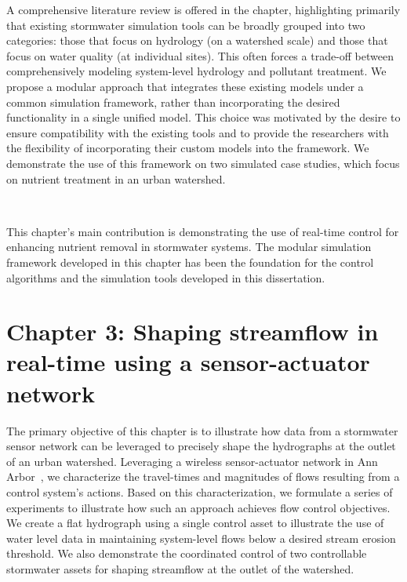 A comprehensive literature review is offered in the chapter, highlighting primarily that existing stormwater simulation tools can be broadly grouped into two categories: those that focus on hydrology (on a watershed scale)\cite{Rossman2010Storm5.1} and those that focus on water quality (at individual sites)\cite{Langergraber2009CWM1:Wetlands}.
This often forces a trade-off between comprehensively modeling system-level hydrology and pollutant treatment.
We propose a modular approach that integrates these existing models under a common simulation framework, rather than incorporating the desired functionality in a single unified model.
This choice was motivated by the desire to ensure compatibility with the existing tools and to provide the researchers with the flexibility of incorporating their custom models into the framework.
We demonstrate the use of this framework on two simulated case studies, which focus on nutrient treatment in an urban watershed.

\

This chapter's main contribution is demonstrating the use of real-time control for enhancing nutrient removal in stormwater systems.
The modular simulation framework developed in this chapter has been the foundation for the control algorithms and the simulation tools developed in this dissertation. 

\section{Chapter 3: Shaping streamflow in real-time using a sensor-actuator network}

The primary objective of this chapter is to illustrate how data from a stormwater sensor network can be leveraged to precisely shape the hydrographs at the outlet of an urban watershed.
Leveraging a wireless sensor-actuator network in Ann Arbor~\cite{Bartos_2018}, we characterize the travel-times and magnitudes of flows resulting from a control system's actions.
Based on this characterization, we formulate a series of experiments to illustrate how such an approach achieves flow control objectives.
We create a flat hydrograph using a single control asset to illustrate the use of water level data in maintaining system-level flows below a desired stream erosion threshold.
We also demonstrate the coordinated control of two controllable stormwater assets for shaping streamflow at the outlet of the watershed.

\

